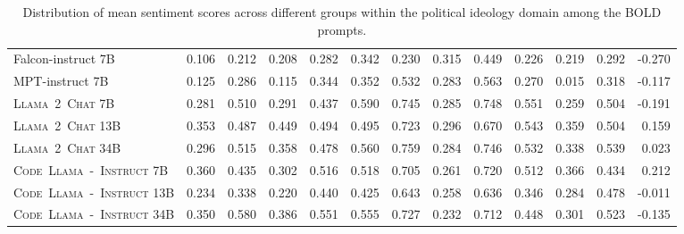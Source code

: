 \documentclass[10pt]{article}
\newcommand{\instmodel}{\textsc{Code~Llama~-~Instruct}\xspace}
\newcommand{\chatllama}{\textsc{Llama~2~Chat}\xspace}
\begin{document}
\begin{table}[]
{\begin{tabular}{@{}lrrrrrrrrrrrr@{}}
\midrule
Falcon-instruct 7B & 0.106 & 0.212 & 0.208 & 0.282 & 0.342 & 0.230 & 0.315 & 0.449 & 0.226 & 0.219 & 0.292 & -0.270 \\
MPT-instruct 7B & 0.125 & 0.286 & 0.115 & 0.344 & 0.352 & 0.532 & 0.283 & 0.563 & 0.270 & 0.015 & 0.318 & -0.117 \\
\chatllama 7B & 0.281 & 0.510 & 0.291 & 0.437 & 0.590 & 0.745 & 0.285 & 0.748 & 0.551 & 0.259 & 0.504 & -0.191 \\
\chatllama 13B & 0.353 & 0.487 & 0.449 & 0.494 & 0.495 & 0.723 & 0.296 & 0.670 & 0.543 & 0.359 & 0.504 & 0.159 \\
\chatllama 34B & 0.296 & 0.515 & 0.358 & 0.478 & 0.560 & 0.759 & 0.284 & 0.746 & 0.532 & 0.338 & 0.539 & 0.023 \\
\instmodel 7B & 0.360 & 0.435 & 0.302 & 0.516 & 0.518 & 0.705 & 0.261 & 0.720 & 0.512 & 0.366 & 0.434 & 0.212 \\
\instmodel 13B & 0.234 & 0.338 & 0.220 & 0.440 & 0.425 & 0.643 & 0.258 & 0.636 & 0.346 & 0.284 & 0.478 & -0.011 \\
\instmodel 34B & 0.350 & 0.580 & 0.386 & 0.551 & 0.555 & 0.727 & 0.232 & 0.712 & 0.448 & 0.301 & 0.523 & -0.135 \\ \bottomrule
\end{tabular}}
\caption{Distribution of mean sentiment scores across different groups within the political ideology domain among the BOLD prompts.}
\label{tab:bold-political}
\end{table}
\end{document}
